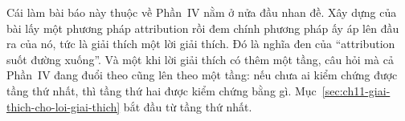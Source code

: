 Cái làm bài báo này thuộc về Phần~IV nằm ở nửa đầu nhan đề. Xây dựng của bài
lấy một phương pháp attribution rồi đem chính phương pháp ấy áp lên đầu ra của
nó, tức là giải thích một lời giải thích. Đó là nghĩa đen của
\enquote{attribution suốt đường xuống}. Và một khi lời giải thích có thêm một
tầng, câu hỏi mà cả Phần~IV đang đuổi theo cũng lên theo một tầng: nếu chưa ai
kiểm chứng được tầng thứ nhất, thì tầng thứ hai được kiểm chứng bằng gì.
Mục~\ref{sec:ch11-giai-thich-cho-loi-giai-thich} bắt đầu từ tầng thứ nhất.









